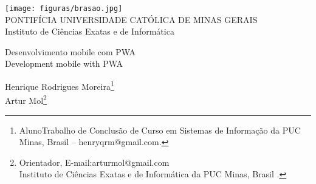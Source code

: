 \documentclass[a4paper,12pt,Times]{article}
\makeatletter
\newcommand{\monog}{Desenvolvimento mobile com PWA}
\newcommand{\monogES}{Development mobile with PWA}
\newcommand{\origem}{Brasil }
\newcommand{\AutorA}{Henrique Rodrigues Moreira}
\newcommand{\funcaoA}{Aluno}
\newcommand{\emailA}{henryqrm@gmail.com}
\newcommand{\cursA}{Trabalho de Conclusão de Curso em Sistemas de Informação da PUC Minas}
\newcommand{\AutorB}{Artur Mol}
\newcommand{\funcaoB}{Orientador}
\newcommand{\emailB}{arturmol@gmail.com}
\newcommand{\cursB}{Instituto de Ciências Exatas e de Informática da PUC Minas}
\newcommand{\keyword}[1]{\textsf{#1}}
\makeatother
\begin{document}

\begin{center}
\texttt{[image: figuras/brasao.jpg]} \\
PONTIFÍCIA UNIVERSIDADE CATÓLICA DE MINAS GERAIS \\
Instituto de Ciências Exatas e de Informática


\end{center}

 \vspace{0cm} {
 \singlespacing \Large{\monog {} \\ }
  \normalsize{\monogES}
 }

\vspace{1.0cm}

\begin{flushright}
\singlespacing 
\normalsize{\AutorA \footnote{\funcaoA \cursA, \origem -- \emailA . }} \\
\normalsize{\AutorB \footnote{\funcaoB, E-mail:\emailB \\ \cursB, \origem. }} \\
\end{flushright}
\thispagestyle{empty}

\vspace{1.0cm}

\begin{abstract}
\noindent
O resumo deverá conter pelo menos cento e cinquenta palavras de acordo com o padrão de normalização da ABNT.
Este artigo irá abordar as principais linguagens de programação voltadas a ambiente WEB usadas atualmente, 
comparando suas características de maneira a indicar o melhor uso para determinada linguagem. 
As linguagens serão divididas de acordo com 4 principais caracteristicas: Interpretadas, compiladas, server-side e client-side.
O resumo deverá conter pelo menos cento e cinquenta palavras de acordo com o padrão de normalização da ABNT.
as linguagens serão divididas de acordo com 4 principais caracteristicas: Interpretadas, compiladas, server-side e client-side.
O resumo deverá conter pelo menos cento e cinquenta palavras de acordo com o padrão de normalização da ABNT.
\\\textbf{\keyword{Palavras-chave: }} Template. \LaTeX. Abakos. Periódicos.
\end{abstract}
\end{document}
